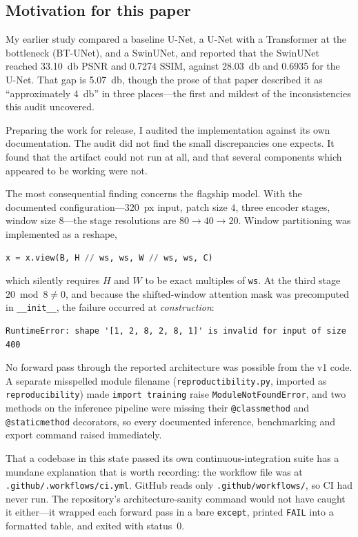 \documentclass[11pt]{article}
\newcommand{\code}[1]{\texttt{\small #1}}
\begin{document}
\subsection{Motivation for this paper}

My earlier study compared a baseline U-Net, a U-Net with a Transformer at the
bottleneck (BT-UNet), and a SwinUNet, and reported that the SwinUNet reached
\SI{33.10}{\decibel} PSNR and \num{0.7274} SSIM, against \SI{28.03}{\decibel}
and \num{0.6935} for the U-Net. That gap is \SI{5.07}{\decibel}, though the
prose of that paper described it as ``approximately \SI{4}{\decibel}'' in three
places---the first and mildest of the inconsistencies this audit uncovered.

Preparing the work for release, I audited the implementation against its own
documentation. The audit did not find the small discrepancies one expects. It
found that the artifact could not run at all, and that several components which
appeared to be working were not.

The most consequential finding concerns the flagship model. With the documented
configuration---\SI{320}{px} input, patch size $4$, three encoder stages, window
size $8$---the stage resolutions are $80 \to 40 \to 20$. Window partitioning was
implemented as a reshape,
\begin{lstlisting}[language=Python]
x = x.view(B, H // ws, ws, W // ws, ws, C)
\end{lstlisting}
which silently requires $H$ and $W$ to be exact multiples of \code{ws}. At the
third stage $20 \bmod 8 \neq 0$, and because the shifted-window attention mask
was precomputed in \code{\_\_init\_\_}, the failure occurred at
\emph{construction}:
\begin{lstlisting}
RuntimeError: shape '[1, 2, 8, 2, 8, 1]' is invalid for input of size 400
\end{lstlisting}
No forward pass through the reported architecture was possible from the v1 code. A separate misspelled module filename (\code{reproductibility.py}, imported
as \code{reproducibility}) made \code{import training} raise
\code{ModuleNotFoundError}, and two methods on the inference pipeline were
missing their \code{@classmethod} and \code{@staticmethod} decorators, so every
documented inference, benchmarking and export command raised immediately.

That a codebase in this state passed its own continuous-integration suite has a
mundane explanation that is worth recording: the workflow file was at
\code{.github/.workflows/ci.yml}. GitHub reads only
\code{.github/workflows/}, so CI had never run. The repository's
architecture-sanity command would not have caught it either---it wrapped each
forward pass in a bare \code{except}, printed \code{FAIL} into a formatted
table, and exited with status~0.
\end{document}
